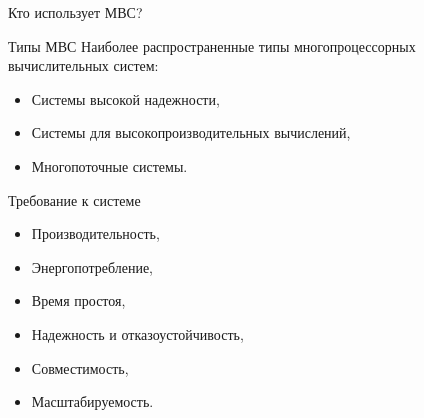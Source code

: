 \begin{frame}{Кто использует МВС?}
\begin{figure}[htpb]
\begin{minipage}[htpb]{0.3\textwidth}
\end{minipage}
\hspace*{0.05\textwidth}
\begin{minipage}[htpb]{0.3\textwidth}
\end{minipage}
\vfill
\begin{minipage}[htpb]{0.3\textwidth}
\end{minipage}
\begin{minipage}[htpb]{0.3\textwidth}
\end{minipage}
\begin{minipage}[htpb]{0.3\textwidth}
\end{minipage}
\end{figure}
\end{frame}

\begin{frame}{Типы МВС}
Наиболее распространенные типы многопроцессорных вычислительных систем:
\begin{itemize}
    \item Системы высокой надежности,
    \item Системы для высокопроизводительных вычислений,
    \item Многопоточные системы.
\end{itemize}
\end{frame}

\begin{frame}{Требование к системе}
\begin{itemize}
    \item Производительность,
    \item Энергопотребление,
    \item Время простоя,
    \item Надежность и отказоустойчивость,
    \item Совместимость,
    \item Масштабируемость.
\end{itemize}
\end{frame}

